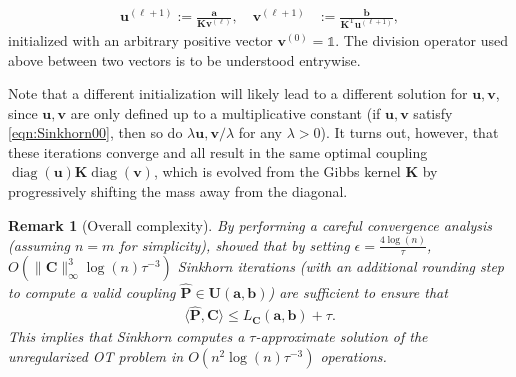 \documentclass[11pt]{book}
\newtheorem{remark}[theorem]{Remark}
\begin{document}
\begin{align}\label{eqn:Sinkhorn01}
    \mathbf{u}^{(\ell+1)} := \frac{\mathbf{a}}{\mathbf{K} \mathbf{v}^{(\ell)}},  
    \quad \mathbf{v}^{(\ell+1)} &:= \frac{\mathbf{b}}{\mathbf{K}^{\mathrm{T}} \mathbf{u}^{(\ell+1)}}, 
\end{align}
initialized with an arbitrary positive vector $\mathbf{v}^{(0)} = \mathbb{1}$. The division operator used above between two vectors is to be understood entrywise. 

Note that a different initialization will likely lead to a different solution for $\mathbf{u}, \mathbf{v}$, since $\mathbf{u}, \mathbf{v}$ are only defined up to a multiplicative constant (if $\mathbf{u}, \mathbf{v}$ satisfy \eqref{eqn:Sinkhorn00}, then so do $\lambda \mathbf{u}, \mathbf{v}/\lambda$ for any $\lambda > 0$). It turns out, however, that these iterations converge and all result in the same optimal coupling $\operatorname{diag}(\mathbf{u}) \mathbf{K} \operatorname{diag}(\mathbf{v})$, which is evolved from the Gibbs kernel $\mathbf{K}$ by progressively shifting the mass away from the diagonal.

\begin{remark}[Overall complexity]
By performing a careful convergence analysis (assuming $n = m$ for simplicity), \cite{altschuler2017near} showed that by setting $\epsilon = \frac{4 \log(n)}{\tau}$, $O(\|\mathbf{C}\|_{\infty}^3 \log(n) \tau^{-3})$ Sinkhorn iterations (with an additional rounding step to compute a valid coupling $\hat{\mathbf{P}} \in \mathbf{U}(\mathbf{a}, \mathbf{b})$) are sufficient to ensure that
\begin{align*}
    \langle \hat{\mathbf{P}}, \mathbf{C} \rangle \leq L_{\mathbf{C}}(\mathbf{a}, \mathbf{b}) + \tau.
\end{align*}
This implies that Sinkhorn computes a $\tau$-approximate solution of the unregularized OT problem in $O(n^2 \log(n) \tau^{-3})$ operations. 
\end{remark}
\end{document}
